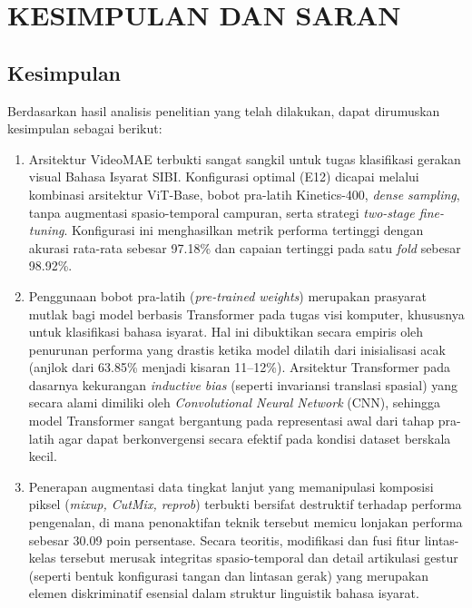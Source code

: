 \newpage
\chapter{KESIMPULAN DAN SARAN} \label{Bab V}

\section{Kesimpulan} \label{V.Kesimpulan}
Berdasarkan hasil analisis penelitian yang telah dilakukan, dapat dirumuskan kesimpulan sebagai berikut:

\begin{enumerate}
  \item Arsitektur VideoMAE terbukti sangat sangkil untuk tugas klasifikasi gerakan visual Bahasa Isyarat SIBI. Konfigurasi optimal (E12) dicapai melalui kombinasi arsitektur ViT-Base, bobot pra-latih Kinetics-400, \textit{dense sampling}, tanpa augmentasi spasio-temporal campuran, serta strategi \textit{two-stage fine-tuning}. Konfigurasi ini menghasilkan metrik performa tertinggi dengan akurasi rata-rata sebesar 97.18\% dan capaian tertinggi pada satu \textit{fold} sebesar 98.92\%.
  
  \item Penggunaan bobot pra-latih (\textit{pre-trained weights}) merupakan prasyarat mutlak bagi model berbasis Transformer pada tugas visi komputer, khususnya untuk klasifikasi bahasa isyarat. Hal ini dibuktikan secara empiris oleh penurunan performa yang drastis ketika model dilatih dari inisialisasi acak (anjlok dari 63.85\% menjadi kisaran 11--12\%). Arsitektur Transformer pada dasarnya kekurangan \textit{inductive bias} (seperti invariansi translasi spasial) yang secara alami dimiliki oleh \textit{Convolutional Neural Network} (CNN), sehingga model Transformer sangat bergantung pada representasi awal dari tahap pra-latih agar dapat berkonvergensi secara efektif pada kondisi dataset berskala kecil.
  
  \item Penerapan augmentasi data tingkat lanjut yang memanipulasi komposisi piksel (\textit{mixup, CutMix, reprob}) terbukti bersifat destruktif terhadap performa pengenalan, di mana penonaktifan teknik tersebut memicu lonjakan performa sebesar 30.09 poin persentase. Secara teoritis, modifikasi dan fusi fitur lintas-kelas tersebut merusak integritas spasio-temporal dan detail artikulasi gestur (seperti bentuk konfigurasi tangan dan lintasan gerak) yang merupakan elemen diskriminatif esensial dalam struktur linguistik bahasa isyarat.
  

\end{enumerate}
